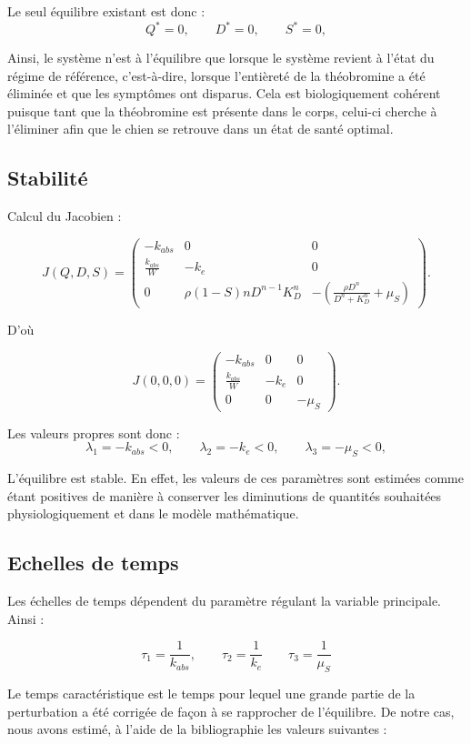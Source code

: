 \documentclass[11pt,a4paper]{article}
\begin{document}
Le seul équilibre existant est donc :
\[
Q^*=0,
\qquad
D^*=0,
\qquad
S^*=0,
\]

Ainsi, le système n'est à l'équilibre que lorsque le système revient à l'état du régime de
référence, c'est-à-dire, lorsque l'entièreté de la théobromine a été éliminée et que les 
symptômes ont disparus. Cela est biologiquement cohérent puisque tant que la théobromine 
est présente dans le corps, celui-ci cherche à l'éliminer afin que le chien se retrouve dans
un état de santé optimal. 

\subsection{Stabilité}


Calcul du Jacobien :

\[
J(Q,D,S)
=
\begin{pmatrix}
-k_{abs} & 0 & 0
\\[0.4em]
\frac{k_{abs}}{W} & -k_e & 0
\\[0.4em]
0 & \rho(1-S)nD^{n-1}K_D^n & - (\frac{\rho D^n}{D^n + K_D^n}+\mu_S)
\end{pmatrix}.
\]

D'où

\[
J(0,0,0)
=
\begin{pmatrix}
-k_{abs} & 0 & 0
\\[0.4em]
\frac{k_{abs}}{W} & -k_e & 0
\\[0.4em]
0 & 0 & - \mu_S
\end{pmatrix}.
\]

Les valeurs propres sont donc : 
\[
\lambda_1=-k_{abs} < 0,
\qquad
\lambda_2=-k_e < 0,
\qquad
\lambda_3=- \mu_S < 0,
\]

L'équilibre est stable. En effet, les valeurs de ces paramètres sont estimées comme étant 
positives de manière à conserver les diminutions de quantités souhaitées physiologiquement
et dans le modèle mathématique. 

\subsection{Echelles de temps}

Les échelles de temps dépendent du paramètre régulant la variable principale. Ainsi :


\[
\tau_1=\frac{1}{k_{abs}},
\qquad
\tau_2=\frac{1}{k_e}
\qquad
\tau_3=\frac{1}{\mu_S}
\]

Le temps caractéristique est le temps pour lequel une grande partie de la perturbation a été
corrigée de façon à se rapprocher de l'équilibre. De notre cas, nous avons estimé, à l'aide
de la bibliographie les valeurs suivantes : 
\end{document}
